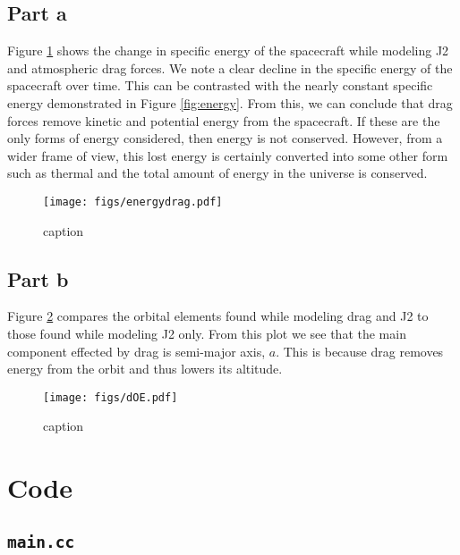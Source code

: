 \documentclass[11pt]{article}
\begin{document}
\subsection{Part a}

Figure \ref{fig:energydrag} shows the change in specific energy of the spacecraft while modeling J2 and atmospheric drag forces. We note a clear decline in the specific energy of the spacecraft over time. This can be contrasted with the nearly constant specific energy demonstrated in Figure \ref{fig:energy}. From this, we can conclude that drag forces remove kinetic and potential energy from the spacecraft. If these are the only forms of energy considered, then energy is not conserved. However, from a wider frame of view, this lost energy is certainly converted into some other form such as thermal and the total amount of energy in the universe is conserved. \\

\begin{figure}[h!]
	\centering
	\texttt{[image: figs/energydrag.pdf]}
	\caption{caption}
	\label{fig:energydrag}
\end{figure}

\subsection{Part b}

Figure \ref{fig:dOE} compares the orbital elements found while modeling drag and J2 to those found while modeling J2 only. From this plot we see that the main component effected by drag is semi-major axis, $a$. This is because drag removes energy from the orbit and thus lowers its altitude. \\

\begin{figure}[h!]
	\centering
	\texttt{[image: figs/dOE.pdf]}
	\caption{caption}
	\label{fig:dOE}
\end{figure}

\newpage
\appendix
\section{Code}

\subsection{\texttt{main.cc}}

\end{document}

